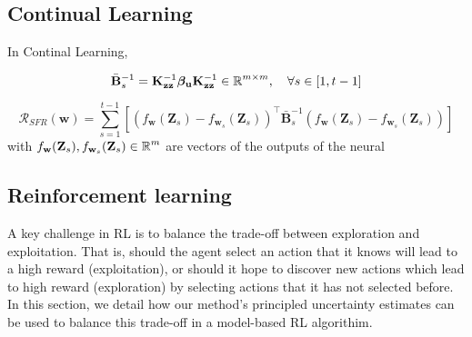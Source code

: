 \documentclass{article}
\newcommand{\mathbold}[1]{\bm{#1}}
\newcommand{\mbf}[1]{\mathbf{#1}}
\newcommand{\MB}{\mbf{B}}
\newcommand{\MZ}{\mbf{Z}}
\newcommand{\T}{\top}
\newcommand{\vbeta}[0]{\mathbold{\beta}}
\newcommand{\vu}{\mbf{u}}
\newcommand{\vw}{\mbf{w}}
\newcommand{\MKzz}{\mbf{K}_{\mbf{z}\mbf{z}}}
\begin{document}
\subsection{Continual Learning}
In Continal Learning,

\begin{equation}
 	\bar{\MB}^{-1}_s = \MKzz^{-1} \vbeta_\vu \MKzz^{-1} \in \R^{m \times m}, \quad \forall s \in [1, t-1]
 \end{equation}

\begin{equation}
	\mathcal{R_\textit{SFR}}(\mathbf{w}) = \sum_{s=1}^{t-1}\left[\left(f_{\vw}(\MZ_{s}) - f_{\vw_{s}}(\MZ_s) \right)^\T \bar{\MB}^{-1}_{s} \left(f_{\vw}(\MZ_{s}) - f_{\vw_{s}}(\MZ_s) \right) \right]
\end{equation} 
with $f_\vw(\MZ_{s}), f_{\vw_s}(\MZ_s) \in \R^m$ are vectors of the outputs of the neural 


\subsection{Reinforcement learning}
A key challenge in RL is to balance the trade-off between exploration and exploitation.
That is, should the agent select an action that it knows will lead to a high reward (exploitation), or should it
hope to discover new actions which lead to high reward (exploration) by selecting actions that it has not selected before.
In this section, we detail how our method's principled uncertainty estimates can be used to balance this trade-off in a model-based RL algorithim.
\end{document}
